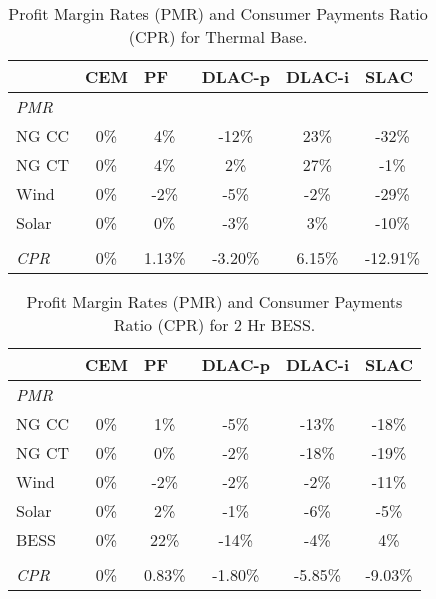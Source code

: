 \documentclass{article}
\begin{document}
\begin{table}[ht]
\centering
\begin{tabular}{lccccc}
\toprule
& \multicolumn{1}{l}{\textbf{CEM}} 
& \multicolumn{1}{l}{\textbf{PF}} 
& \multicolumn{1}{l}{\textbf{DLAC-p}} 
& \multicolumn{1}{l}{\textbf{DLAC-i}} 
& \multicolumn{1}{l}{\textbf{SLAC}} 
 \\ \hline
\midrule
\textit{PMR} & & & & \\
\quad NG CC & 0\% & 4\% & -12\% & 23\% & -32\% \\
\quad NG CT & 0\% & 4\% & 2\% & 27\% & -1\% \\
\quad Wind & 0\% & -2\% & -5\% & -2\% & -29\% \\
\quad Solar & 0\% & 0\% & -3\% & 3\% & -10\% \\
& & & & \\
\textit{CPR} & 0\% & 1.13\% & -3.20\% & 6.15\% & -12.91\% \\
\bottomrule
\end{tabular}
\caption{Profit Margin Rates (PMR) and Consumer Payments Ratio (CPR) for Thermal Base.}
\label{table:Thermal_Base_pmr}
\end{table}

\begin{table}[ht]
\centering
\begin{tabular}{lccccc}
\toprule
& \multicolumn{1}{l}{\textbf{CEM}} 
& \multicolumn{1}{l}{\textbf{PF}} 
& \multicolumn{1}{l}{\textbf{DLAC-p}} 
& \multicolumn{1}{l}{\textbf{DLAC-i}} 
& \multicolumn{1}{l}{\textbf{SLAC}} 
 \\ \hline
\midrule
\textit{PMR} & & & & \\
\quad NG CC & 0\% & 1\% & -5\% & -13\% & -18\% \\
\quad NG CT & 0\% & 0\% & -2\% & -18\% & -19\% \\
\quad Wind & 0\% & -2\% & -2\% & -2\% & -11\% \\
\quad Solar & 0\% & 2\% & -1\% & -6\% & -5\% \\
\quad BESS & 0\% & 22\% & -14\% & -4\% & 4\% \\
& & & & \\
\textit{CPR} & 0\% & 0.83\% & -1.80\% & -5.85\% & -9.03\% \\
\bottomrule
\end{tabular}
\caption{Profit Margin Rates (PMR) and Consumer Payments Ratio (CPR) for 2 Hr BESS.}
\label{table:2_Hr_BESS_pmr}
\end{table}
\end{document}
